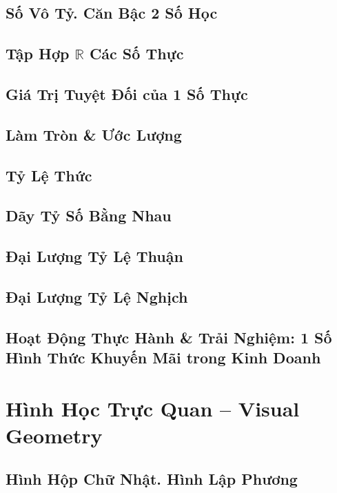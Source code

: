 \documentclass[oneside]{book}
\numberwithin{equation}{section}
\begin{document}
\section{Số Vô Tỷ. Căn Bậc 2 Số Học}

\section{Tập Hợp $\mathbb{R}$ Các Số Thực}

\section{Giá Trị Tuyệt Đối của 1 Số Thực}

\section{Làm Tròn \& Ước Lượng}

\section{Tỷ Lệ Thức}

\section{Dãy Tỷ Số Bằng Nhau}

\section{Đại Lượng Tỷ Lệ Thuận}

\section{Đại Lượng Tỷ Lệ Nghịch}

\section{Hoạt Động Thực Hành \& Trải Nghiệm: 1 Số Hình Thức Khuyến Mãi trong Kinh Doanh}


\chapter{Hình Học Trực Quan -- Visual Geometry}

\section{Hình Hộp Chữ Nhật. Hình Lập Phương}
\end{document}
